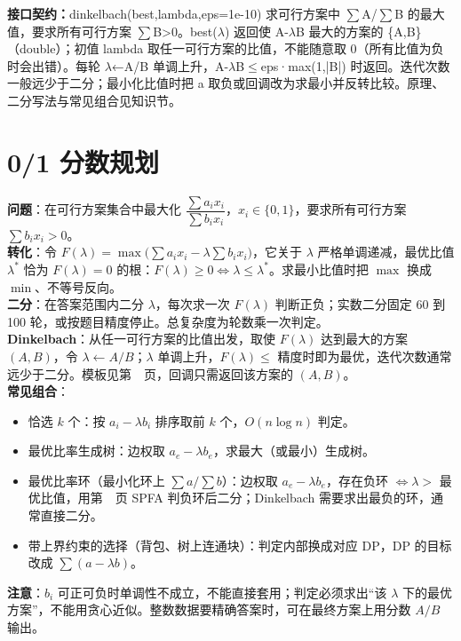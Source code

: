 {\sloppy{}\noindent\textbf{接口契约：}dinkelbach(best,lambda,eps=1e-10) 求可行方案中 $\sum$A/$\sum$B 的最大值，要求所有可行方案 $\sum$B>0。best($\lambda$) 返回使 A-$\lambda$B 最大的方案的 \{A,B\}（double）；初值 lambda 取任一可行方案的比值，不能随意取 0（所有比值为负时会出错）。每轮 $\lambda$←A/B 单调上升，A-$\lambda$B$\le$eps·max(1,|B|) 时返回。迭代次数一般远少于二分；最小化比值时把 a 取负或回调改为求最小并反转比较。原理、二分写法与常见组合见知识节。\par}



\section{0/1 分数规划}\label{knowledge-frac-programming}
\textbf{问题}：在可行方案集合中最大化 $\dfrac{\sum a_i x_i}{\sum b_i x_i}$，$x_i\in\{0,1\}$，要求所有可行方案 $\sum b_ix_i>0$。\\
\textbf{转化}：令 $F(\lambda)=\max\bigl(\sum a_ix_i-\lambda\sum b_ix_i\bigr)$，它关于 $\lambda$ 严格单调递减，最优比值 $\lambda^*$ 恰为 $F(\lambda)=0$ 的根：$F(\lambda)\ge0\iff\lambda\le\lambda^*$。求最小比值时把 $\max$ 换成 $\min$、不等号反向。\\
\textbf{二分}：在答案范围内二分 $\lambda$，每次求一次 $F(\lambda)$ 判断正负；实数二分固定 60 到 100 轮，或按题目精度停止。总复杂度为轮数乘一次判定。\\
\textbf{Dinkelbach}：从任一可行方案的比值出发，取使 $F(\lambda)$ 达到最大的方案 $(A,B)$，令 $\lambda\gets A/B$；$\lambda$ 单调上升，$F(\lambda)\le$ 精度时即为最优，迭代次数通常远少于二分。模板见第~\pageref{compact-dinkelbach}~页，回调只需返回该方案的 $(A,B)$。\\
\textbf{常见组合}：
\begin{itemize}
\item 恰选 $k$ 个：按 $a_i-\lambda b_i$ 排序取前 $k$ 个，$O(n\log n)$ 判定。
\item 最优比率生成树：边权取 $a_e-\lambda b_e$，求最大（或最小）生成树。
\item 最优比率环（最小化环上 $\sum a/\sum b$）：边权取 $a_e-\lambda b_e$，存在负环 $\iff\lambda>$ 最优比值，用第~\pageref{compact-Spfa}~页 SPFA 判负环后二分；Dinkelbach 需要求出最负的环，通常直接二分。
\item 带上界约束的选择（背包、树上连通块）：判定内部换成对应 DP，DP 的目标改成 $\sum(a-\lambda b)$。
\end{itemize}
\textbf{注意}：$b_i$ 可正可负时单调性不成立，不能直接套用；判定必须求出“该 $\lambda$ 下的最优方案”，不能用贪心近似。整数数据要精确答案时，可在最终方案上用分数 $A/B$ 输出。


